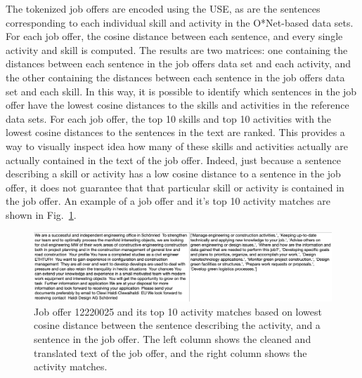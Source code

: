 The tokenized job offers are encoded using the USE, as are the sentences corresponding to each individual skill and activity in the O*Net-based data sets. For each job offer, the cosine distance between each sentence, and every single activity and skill is computed. The results are two matrices: one containing the distances between each sentence in the job offers data set and each activity, and the other containing the distances between each sentence in the job offers data set and each skill. In this way, it is possible to identify which sentences in the job offer have the lowest cosine distances to the skills and activities in the reference data sets. For each job offer, the top 10 skills and top 10 activities with the lowest cosine distances to the sentences in the text are ranked. This provides a way to visually inspect idea how many of these skills and activities actually are actually contained in the text of the job offer. Indeed, just because a sentence describing a skill or activity has a low cosine distance to a sentence in the job offer, it does not guarantee that that particular skill or activity is contained in the job offer. An example of a job offer and it's top 10 activity matches are shown in Fig.~\ref{fig:topten}.

\begin{figure}[htbp]
  \centering
    \includegraphics[width=1.0\textwidth]{figures/topten.pdf}
    \caption[Job offer 12220025 and its top 10 activity matches based on lowest cosine distance between the sentence describing the activity, and a sentence in the job offer]{
    Job offer 12220025 and its top 10 activity matches based on lowest cosine distance between the sentence describing the activity, and a sentence in the job offer. The left column shows the cleaned and translated text of the job offer, and the right column shows the activity matches.
    }
\label{fig:topten}
\end{figure}

